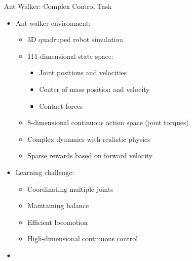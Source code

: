 \documentclass[10pt]{beamer}
\begin{document}
\begin{frame}{Ant Walker: Complex Control Task}
    \begin{itemize}
        \item Ant-walker environment:
        \begin{itemize}
            \item 3D quadruped robot simulation
            \item 111-dimensional state space:
            \begin{itemize}
                \item Joint positions and velocities
                \item Center of mass position and velocity
                \item Contact forces
            \end{itemize}
            \item 8-dimensional continuous action space (joint torques)
            \item Complex dynamics with realistic physics
            \item Sparse rewards based on forward velocity
        \end{itemize}
        \vspace{0.2cm}
        \item Learning challenge:
        \begin{itemize}
            \item Coordinating multiple joints
            \item Maintaining balance
            \item Efficient locomotion
            \item High-dimensional continuous control
        \end{itemize}
        \vspace{0.2cm}
        \item [YouTube Video Link: Ant Walker SAC Training]
    \end{itemize}
\end{frame}
\end{document}
